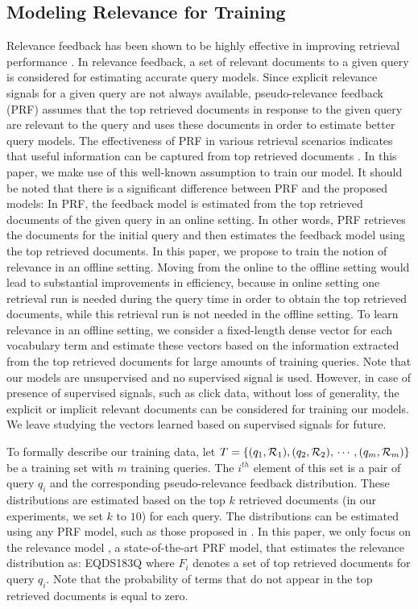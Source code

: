 \documentclass[sigconf]{acmart}
\begin{document}
\subsection{Modeling Relevance for Training}
\label{sec:prf}
Relevance feedback has been shown to be highly effective in improving retrieval performance \cite{Rocchio:1971,Croft:2009}. In relevance feedback, a set of relevant documents to a given query is considered for estimating accurate query models. Since explicit relevance signals for a given query are not always available, pseudo-relevance feedback (PRF) assumes that the top retrieved documents in response to the given query are relevant to the query and uses these documents in order to estimate better query models. The effectiveness of PRF in various retrieval scenarios indicates that useful information can be captured from top retrieved documents \cite{Lavrenko:2001,Lavrenko:2002,Zhai:2001}. In this paper, we make use of this well-known assumption to train our model. It should be noted that there is a significant difference between PRF and the proposed models: In PRF, the feedback model is estimated from the top retrieved documents of the given query in an online setting. In other words, PRF retrieves the documents for the initial query and then estimates the feedback model using the top retrieved documents. In this paper, we propose to train the notion of relevance in an offline setting. Moving from the online to the offline setting would lead to substantial improvements in efficiency, because in online setting one retrieval run is needed during the query time in order to obtain the top retrieved documents, while this retrieval run is not needed in the offline setting. To learn relevance in an offline setting, we consider a fixed-length dense vector for each vocabulary term and estimate these vectors based on the information extracted from the top retrieved documents for large amounts of training queries. Note that our models are unsupervised and no supervised signal is used. However, in case of presence of supervised signals, such as click data, without loss of generality, the explicit or implicit relevant documents can be considered for training our models. We leave studying the vectors learned based on supervised signals for future.

To formally describe our training data, let $T=\{(q_1, \mathcal{R}_1), (q_2, \mathcal{R}_2),\\ \cdots, (q_m, \mathcal{R}_m)\}$ be a training set with $m$ training queries. The $i^{th}$ element of this set is a pair of query $q_i$ and the corresponding pseudo-relevance feedback distribution. These distributions are estimated based on the top $k$ retrieved documents (in our experiments, we set $k$ to $10$) for each query. The distributions can be estimated using any PRF model, such as those proposed in \cite{Lavrenko:2001,Tao:2006b,Zamani:2016:CIKM,Zhai:2001}. In this paper, we only focus on the relevance model \cite{Lavrenko:2001}, a state-of-the-art PRF model, that estimates the relevance distribution as:
EQDS183Q
where $F_i$ denotes a set of top retrieved documents for query $q_i$. Note that the probability of terms that do not appear in the top retrieved documents is equal to zero.
\end{document}
